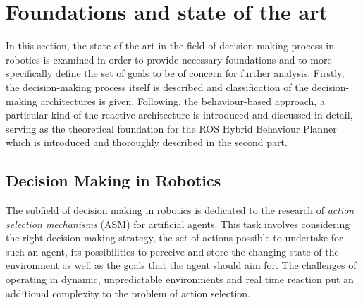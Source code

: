 \chapter{Foundations and state of the art}
In this section, the state of the art in the field of decision-making process in robotics is examined in order to provide necessary foundations and to more specifically define the set of goals to be of concern for further analysis. Firstly, the decision-making process itself is described and classification of the decision-making architectures is given. Following, the behaviour-based approach, a particular kind of the reactive architecture is introduced and discussed in detail, serving as the theoretical foundation for the ROS Hybrid Behaviour Planner which is introduced and thoroughly described in the second part.\par
\section{Decision Making in Robotics}
The subfield of decision making in robotics is dedicated to the research of \textit{action selection mechanisms} (ASM) for artificial agents. This task involves considering the right decision making strategy, the set of actions possible to undertake for such an agent, its possibilities to perceive and store the changing state of the environment as well as the goals that the agent should aim for. The challenges of operating in dynamic, unpredictable environments and real time reaction put an additional complexity to the problem of action selection. 
